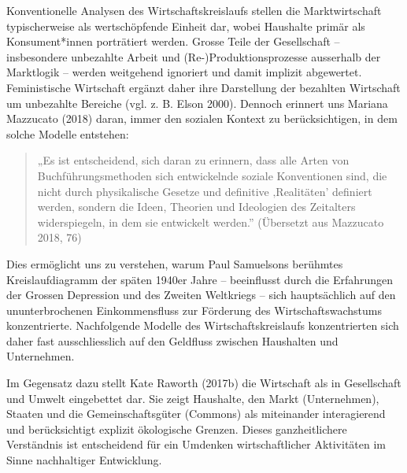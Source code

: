 \documentclass[
  nswissgerman,
  a4paper,
  DIV=11,
  numbers=noendperiod,
  oneside,
  openany]{scrreprt}
\begin{document}
Konventionelle Analysen des Wirtschaftskreislaufs stellen die
Marktwirtschaft typischerweise als wertschöpfende Einheit dar, wobei
Haushalte primär als Konsument*innen porträtiert werden. Grosse Teile
der Gesellschaft -- insbesondere unbezahlte Arbeit und
(Re-)Produktionsprozesse ausserhalb der Marktlogik -- werden weitgehend
ignoriert und damit implizit abgewertet. Feministische Wirtschaft
ergänzt daher ihre Darstellung der bezahlten Wirtschaft um unbezahlte
Bereiche (vgl. z. B. Elson 2000). Dennoch erinnert uns Mariana Mazzucato
(2018) daran, immer den sozialen Kontext zu berücksichtigen, in dem
solche Modelle entstehen:

\begin{quote}
„Es ist entscheidend, sich daran zu erinnern, dass alle Arten von
Buchführungsmethoden sich entwickelnde soziale Konventionen sind, die
nicht durch physikalische Gesetze und definitive ‚Realitäten' definiert
werden, sondern die Ideen, Theorien und Ideologien des Zeitalters
widerspiegeln, in dem sie entwickelt werden.'' (Übersetzt aus Mazzucato
2018, 76)
\end{quote}

Dies ermöglicht uns zu verstehen, warum Paul Samuelsons berühmtes
Kreislaufdiagramm der späten 1940er Jahre -- beeinflusst durch die
Erfahrungen der Grossen Depression und des Zweiten Weltkriegs -- sich
hauptsächlich auf den ununterbrochenen Einkommensfluss zur Förderung des
Wirtschaftswachstums konzentrierte. Nachfolgende Modelle des
Wirtschaftskreislaufs konzentrierten sich daher fast ausschliesslich auf
den Geldfluss zwischen Haushalten und Unternehmen.

Im Gegensatz dazu stellt Kate Raworth (2017b) die Wirtschaft als in
Gesellschaft und Umwelt eingebettet dar. Sie zeigt Haushalte, den Markt
(Unternehmen), Staaten und die Gemeinschaftsgüter (Commons) als
miteinander interagierend und berücksichtigt explizit ökologische
Grenzen. Dieses ganzheitlichere Verständnis ist entscheidend für ein
Umdenken wirtschaftlicher Aktivitäten im Sinne nachhaltiger Entwicklung.
\end{document}
